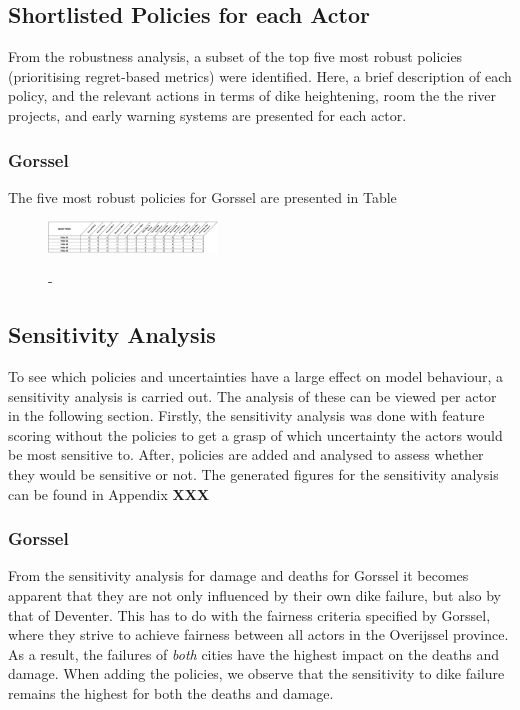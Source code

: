 \subsection{Shortlisted Policies for each Actor}
From the robustness analysis, a subset of the top five most robust policies (prioritising regret-based metrics) were identified. Here, a brief description of each policy, and the relevant actions in terms of dike heightening, room the the river projects, and early warning systems are presented for each actor.
\subsubsection{Gorssel}
The five most robust policies for Gorssel are presented in Table
\begin{figure}[h]
    \centering
    \caption{-}
    \includegraphics[width=0.4\textwidth]{report/figures/gpols.png}
    \label{fig:msmordm}
\end{figure}


\subsection{Sensitivity Analysis}

To see which policies and uncertainties have a large effect on model behaviour, a sensitivity analysis is carried out. The analysis of these can be viewed per actor in the following section. Firstly, the sensitivity analysis was done with feature scoring without the policies to get a grasp of which uncertainty the actors would be most sensitive to. After, policies are added and analysed to assess whether they would be sensitive or not. The generated figures for the sensitivity analysis can be found in Appendix \textbf{XXX}

\subsubsection{Gorssel}

From the sensitivity analysis for damage and deaths for Gorssel it becomes apparent that they are not only influenced by their own dike failure, but also by that of Deventer. This has to do with the fairness criteria specified by Gorssel, where they strive to achieve fairness between all actors in the Overijssel province. As a result, the failures of \textit{both} cities have the highest impact on the deaths and damage. When adding the policies, we observe that the sensitivity to dike failure remains the highest for both the deaths and damage. 

